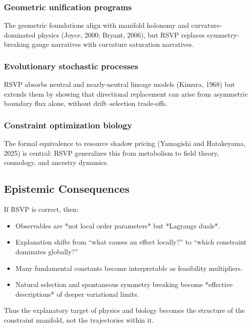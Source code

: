 \documentclass[11pt,a4paper]{article}
\begin{document}
\subsubsection{Geometric unification programs}
The geometric foundations align with manifold holonomy and curvature-dominated physics (Joyce, 2000; Bryant, 2006), but RSVP replaces symmetry-breaking gauge narratives with curvature saturation narratives.

\subsubsection{Evolutionary stochastic processes}
RSVP absorbs neutral and nearly-neutral lineage models (Kimura, 1968) but extends them by showing that directional replacement can arise from asymmetric boundary flux alone, without drift–selection trade-offs.

\subsubsection{Constraint optimization biology}
The formal equivalence to resource shadow pricing (Yamagishi and Hatakeyama, 2025) is central: RSVP generalizes this from metabolism to field theory, cosmology, and ancestry dynamics.

\subsection{Epistemic Consequences}

If RSVP is correct, then:

\begin{itemize}
    \item Observables are *not local order parameters* but *Lagrange duals*.
    \item Explanation shifts from “what causes an effect locally?” to “which constraint dominates globally?”
    \item Many fundamental constants become interpretable as feasibility multipliers.
    \item Natural selection and spontaneous symmetry breaking become *effective descriptions* of deeper variational limits.
\end{itemize}

Thus the explanatory target of physics and biology becomes the structure of the constraint manifold, not the trajectories within it.
\end{document}
